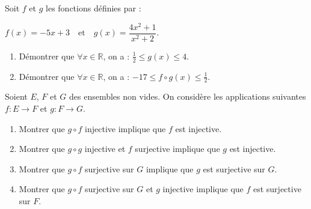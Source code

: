 \documentclass{article}
\begin{document}

\bigskip

Soit \( f \) et \( g \) les fonctions définies par :  

\( f(x) = -5x + 3 \quad \text{et} \quad g(x) = \dfrac{4x^2 + 1}{x^2 + 2}. \)

\begin{enumerate}
    \item Démontrer que \( \forall x \in \mathbb{R} \), on a :  
\( \frac{1}{2} \leq g(x) \leq 4. \)
    \item Démontrer que \( \forall x \in \mathbb{R} \), on a :  
    \(  -17 \leq f \circ g(x) \leq \frac{1}{2}. \)
\end{enumerate}

\bigskip


\bigskip

Soient \( E \), \( F \) et \( G \) des ensembles non vides. On considère les applications suivantes  
\( f : E \to F \) et \( g : F \to G \).

\begin{enumerate}
    \item Montrer que \( g \circ f \) injective implique que \( f \) est injective.
    \item Montrer que \( g \circ g \) injective et \( f \) surjective implique que \( g \) est injective.
    \item Montrer que \( g \circ f \) surjective sur \( G \) implique que \( g \) est surjective sur \( G \).
    \item Montrer que \( g \circ f \) surjective sur \( G \) et \( g \) injective implique que \( f \) est surjective sur \( F \).
\end{enumerate}
\end{document}
